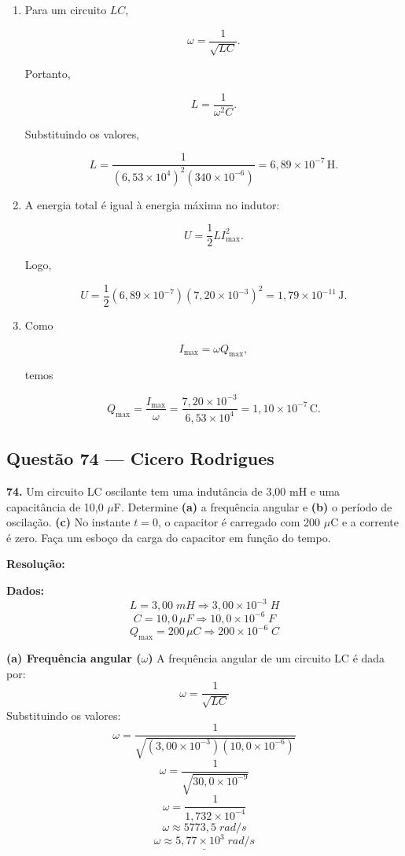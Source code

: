 \documentclass[12pt,a4paper]{article}
\begin{document}
\begin{enumerate}
    \item[(a)] Para um circuito \(LC\),

    \[
    \omega=\frac{1}{\sqrt{LC}}.
    \]

    Portanto,

    \[
    L=\frac{1}{\omega^2 C}.
    \]

    Substituindo os valores,

    \[
    L=
    \frac{1}{(6{,}53\times 10^4)^2(340\times 10^{-6})}
    =
    6{,}89\times 10^{-7}\,\text{H}.
    \]

    \item[(b)] A energia total é igual à energia máxima no indutor:

    \[
    U=\frac{1}{2}LI_{\max}^2.
    \]

    Logo,

    \[
    U=
    \frac{1}{2}(6{,}89\times 10^{-7})(7{,}20\times 10^{-3})^2
    =
    1{,}79\times 10^{-11}\,\text{J}.
    \]

    \item[(c)] Como

    \[
    I_{\max}=\omega Q_{\max},
    \]

    temos

    \[
    Q_{\max}=\frac{I_{\max}}{\omega}
    =
    \frac{7{,}20\times 10^{-3}}{6{,}53\times 10^4}
    =
    1{,}10\times 10^{-7}\,\text{C}.
    \]
\end{enumerate}

\subsection{Questão 74 — Cicero Rodrigues}

\textbf{74. }\normalfont Um circuito LC oscilante tem uma indutância de 3,00 mH e uma capacitância de 10,0 $\mu$F. Determine \textbf{(a)} a frequência angular e \textbf{(b)} o período de oscilação. \textbf{(c)} No instante $t = 0$, o capacitor é carregado com 200 $\mu$C e a corrente é zero. Faça um esboço da carga do capacitor em função do tempo.

\textbf{Resolução:}
\vspace{0.3cm}

\textbf{Dados:}
\[L = 3,00\;mH \Rightarrow 3,00 \times 10^{-3}\;H\]
\[C = 10,0\,\mu F \Rightarrow 10,0 \times 10^{-6}\;F\]
\[Q_{\max} = 200\,\mu C \Rightarrow 200 \times 10^{-6}\;C\]

\vspace{0.2cm}
\textbf{(a) Frequência angular (\(\omega\))}
A frequência angular de um circuito LC é dada por:
\[\omega = \frac{1}{\sqrt{LC}}\]
Substituindo os valores:
\[\omega = \frac{1}{\sqrt{(3,00 \times 10^{-3})(10,0 \times 10^{-6})}}\]
\[\omega = \frac{1}{\sqrt{30,0 \times 10^{-9}}}\]
\[\omega = \frac{1}{1,732 \times 10^{-4}}\]
\[\omega \approx 5773,5\;rad/s\]
\[\underline{\omega \approx 5,77 \times 10^3\;rad/s}\]
\end{document}

